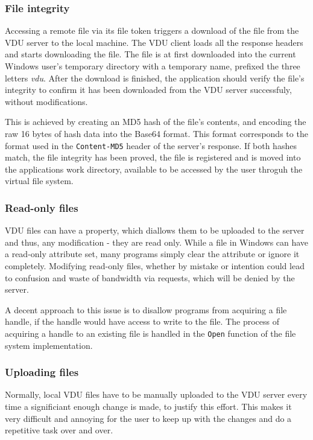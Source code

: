 \subsubsection{File integrity}
Accessing a remote file via its file token triggers a download of the file from the VDU server to the local machine. The VDU client loads all the response headers and starts downloading the file. The file is at first downloaded into the current Windows user's temporary directory with a temporary name, prefixed the three letters \textit{vdu}. After the download is finished, the application should verify the file's integrity to confirm it has been downloaded from the VDU server successfuly, without modifications.

This is achieved by creating an MD5 hash of the file's contents, and encoding the raw 16 bytes of hash data into the Base64 format. This format corresponds to the format used in the \lstinline{Content-MD5} header of the server's response. If both hashes match, the file integrity has been proved, the file is registered and is moved into the applications work directory, available to be accessed by the user throguh the virtual file system.

\subsubsection{Read-only files}
VDU files can have a property, which diallows them to be uploaded to the server and thus, any modification - they are read only. While a file in Windows can have a read-only attribute set, many programs simply clear the attribute or ignore it completely. Modifying read-only files, whether by mistake or intention could lead to confusion and waste of bandwidth via requests, which will be denied by the server.

A decent approach to this issue is to disallow programs from acquiring a file handle, if the handle would have access to write to the file. The process of acquiring a handle to an existing file is handled in the \lstinline{Open} function of the file system implementation. 

\subsubsection{Uploading files}
Normally, local VDU files have to be manually uploaded to the VDU server every time a significiant enough change is made, to justify this effort. This makes it very difficult and annoying for the user to keep up with the changes and do a repetitive task over and over.


